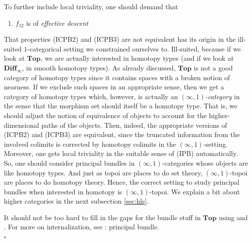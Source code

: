 \begin{exa}[Bundles 2]
To further include local triviality, one should demand that
\begin{enumerate}
\item[(IPB)]
$f_{12}$ is of \textit{effective descent}
\end{enumerate}
That properties (ICPB2) and (ICPB3) are not equivalent has its origin in the ill-suited $1$-categorical setting we constrained ourselves to.
Ill-suited, because if we look at $\mathbf{Top}$, we are actually interested in homotopy types (and if we look at $\mathbf{Diff}_{\infty}$, in smooth homotopy types).
As already discussed, $\mathbf{Top}$ is not a good category of homotopy types since it contains spaces with a broken notion of nearness.
If we exclude such spaces in an appropriate sense, then we get a category of homotopy types which, however, is actually an \textit{$(\infty,1)$-category} in the sense that the morphism set should itself be a homotopy type.
That is, we should adjust the notion of equivalence of objects to account for the higher-dimensional paths of the objects.
Then, indeed, the appropriate versions of (ICPB2) and (ICPB3) are equivalent, since the truncated information from the involved colimits is corrected by homotopy colimits in the $(\infty,1)$-setting.
Moreover, one gets local triviality in the suitable sense of (IPB) automatically.
So, one should consider principal bundles in $(\infty,1)$-categories whose objects are like homotopy types.
And just as topoi are places to do set theory, $(\infty,1)$-topoi are places to do homotopy theory.
Hence, the correct setting to study principal bundles when interested in homotopy is $(\infty,1)$-topoi.
We explain a bit about higher categories in the next subsection \ref{sec:hls}.
\end{exa}
\begin{prf}
It should not be too hard to fill in the gaps for the bundle stuff in $\mathbf{Top}$ using \cite{240b19f3} and \cite{797789bc}.
For more on internalization, see \cite{wiki-nlab0000}: principal bundle.
\\
\phantom{proven}
\hfill
$\square$
\end{prf}
